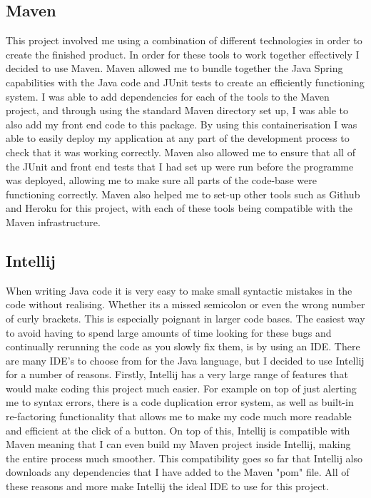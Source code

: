 \subsection{Maven}

This project involved me using a combination of different technologies in order to create the finished product. In order for these tools to work together effectively I decided to use Maven. Maven allowed me to bundle together the Java Spring capabilities with the Java code and JUnit tests to create an efficiently functioning system. I was able to add dependencies for each of the tools to the Maven project, and through using the standard Maven directory set up, I was able to also add my front end code to this package. By using this containerisation I was able to easily deploy my application at any part of the development process to check that it was working correctly. Maven also allowed me to ensure that all of the JUnit and front end tests that I had set up were run before the programme was deployed, allowing me to make sure all parts of the code-base were functioning correctly. Maven also helped me to set-up other tools such as Github and Heroku for this project, with each of these tools being compatible with the Maven infrastructure.

\subsection{Intellij}

When writing Java code it is very easy to make small syntactic mistakes in the code without realising. Whether its a missed semicolon or even the wrong number of curly brackets. This is especially poignant in larger code bases. The easiest way to avoid having to spend large amounts of time looking for these bugs and continually rerunning the code as you slowly fix them, is by using an IDE. There are many IDE's to choose from for the Java language, but I decided to use Intellij for a number of reasons. Firstly, Intellij has a very large range of features that would make coding this project much easier. For example on top of just alerting me to syntax errors, there is a code duplication error system, as well as built-in re-factoring functionality that allows me to make my code much more readable and efficient at the click of a button. On top of this, Intellij is compatible with Maven meaning that I can even build my Maven project inside Intellij, making the entire process much smoother. This compatibility goes so far that Intellij also downloads any dependencies that I have added to the Maven "pom" file. All of these reasons and more make Intellij the ideal IDE to use for this project.

